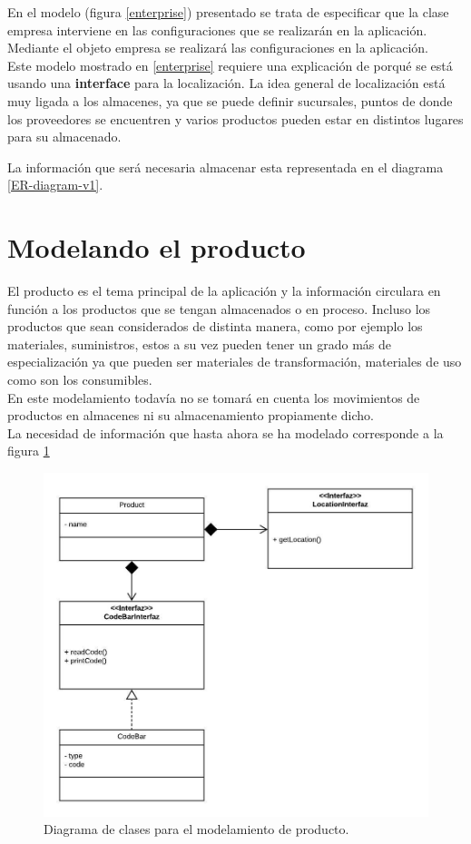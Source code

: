 En el modelo (figura \ref{enterprise}) presentado se trata de especificar que la clase empresa interviene en las configuraciones que se realizarán en la aplicación. Mediante el objeto empresa se realizará las configuraciones en la aplicación.\\

Este modelo mostrado en \ref{enterprise} requiere una explicación de porqué se está usando una \textbf{interface} para la localización. La idea general de localización está muy ligada a los almacenes, ya que se puede definir sucursales, puntos de donde los proveedores se encuentren y varios productos pueden estar en distintos lugares para su almacenado.

La información que será necesaria almacenar esta representada en el diagrama \ref{ER-diagram-v1}.

\section{Modelando el producto}

El producto es el tema principal de la aplicación y la información circulara en función a los productos que se tengan almacenados o en proceso. Incluso los productos que sean considerados de distinta manera, como por ejemplo los materiales, suministros, estos a su vez pueden tener un grado más de especialización ya que pueden ser materiales de transformación, materiales de uso como son los consumibles.\\

En este modelamiento todavía no se tomará en cuenta los movimientos de productos en almacenes ni su almacenamiento propiamente dicho.\\

La necesidad de información que hasta ahora se ha modelado corresponde a la figura \ref{Product-classes}

\begin{figure}
  \centering
    \includegraphics[scale=0.9]{./Capitulo3/figs/ADDStock-Product.jpeg}
  \caption{Diagrama de clases para el modelamiento de producto.}
  \label{Product-classes}
\end{figure}

